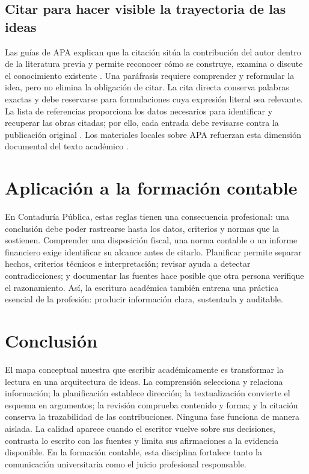 \documentclass[spanish,letterpaper,oneside]{article}
\begin{document}
\subsection{Citar para hacer visible la trayectoria de las ideas}

Las guías de APA explican que la citación sitúa la contribución del autor dentro de la literatura previa y permite reconocer cómo se construye, examina o discute el conocimiento existente \citep{apaCitasTexto2024}. Una paráfrasis requiere comprender y reformular la idea, pero no elimina la obligación de citar. La cita directa conserva palabras exactas y debe reservarse para formulaciones cuya expresión literal sea relevante. La lista de referencias proporciona los datos necesarios para identificar y recuperar las obras citadas; por ello, cada entrada debe revisarse contra la publicación original \citep{apaReferencias2023}. Los materiales locales sobre APA refuerzan esta dimensión documental del texto académico \citep{uasUnidadCitasAPA,uasResumenAPA7}.

\section{Aplicación a la formación contable}

En Contaduría Pública, estas reglas tienen una consecuencia profesional: una conclusión debe poder rastrearse hasta los datos, criterios y normas que la sostienen. Comprender una disposición fiscal, una norma contable o un informe financiero exige identificar su alcance antes de citarlo. Planificar permite separar hechos, criterios técnicos e interpretación; revisar ayuda a detectar contradicciones; y documentar las fuentes hace posible que otra persona verifique el razonamiento. Así, la escritura académica también entrena una práctica esencial de la profesión: producir información clara, sustentada y auditable.

\section{Conclusión}

El mapa conceptual muestra que escribir académicamente es transformar la lectura en una arquitectura de ideas. La comprensión selecciona y relaciona información; la planificación establece dirección; la textualización convierte el esquema en argumentos; la revisión comprueba contenido y forma; y la citación conserva la trazabilidad de las contribuciones. Ninguna fase funciona de manera aislada. La calidad aparece cuando el escritor vuelve sobre sus decisiones, contrasta lo escrito con las fuentes y limita sus afirmaciones a la evidencia disponible. En la formación contable, esta disciplina fortalece tanto la comunicación universitaria como el juicio profesional responsable.


\end{document}
